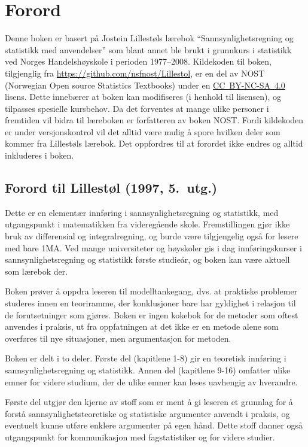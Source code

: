 
\chapter*{Forord}

Denne boken er basert på Jostein Lillestøls lærebok 
``Sannsynlighetsregning og statistikk med anvendelser'' som blant annet ble
brukt i grunnkurs i statistikk ved Norges Handelshøyskole i perioden 1977--2008.
Kildekoden til boken, tilgjenglig fra \url{https://github.com/nsfnost/Lillestol}, er en del av NOST (Norwegian Open source Statistics Textbooks)
under en \href{https://creativecommons.org/licenses/by-nc-sa/4.0/}{CC~BY-NC-SA~4.0} lisens. Dette innebærer
at boken kan modifiseres (i henhold til lisensen), og tilpasses spesielle kursbehov.
Da det forventes at mange ulike personer i fremtiden vil bidra til læreboken
er forfatteren av boken NOST. Fordi kildekoden er under versjonskontrol vil
det alltid være mulig å spore hvilken deler som kommer fra Lillestøls lærebok.
Det oppfordres til at forordet ikke endres og alltid inkluderes i boken.

\section*{Forord til Lillestøl (1997, 5.~utg.)}
Dette er en elementær innføring i sannsynlighetsregning og
statistikk, med utgangspunkt i matematikken fra videregående skole.
Fremstillingen gjør ikke bruk av differensial og integralregning,
og burde være tilgjengelig også for lesere med bare 1MA.
Ved mange universiteter og høyskoler gis i dag innføringskurser i
sannsynlighetsregning og statistikk første studieår, og boken kan
være aktuell som lærebok der.

Boken prøver å oppdra leseren til modelltankegang, dvs. at
praktiske problemer studeres innen en teoriramme, der konklusjoner
bare har gyldighet i relasjon til de forutsetninger som gjøres.
Boken er ingen kokebok for de metoder som oftest anvendes i praksis,
ut fra oppfatningen at det ikke er en metode alene som overføres til nye
situasjoner, men argumentasjon for metoden.

Boken er delt i to deler.  Første del (kapitlene 1-8) gir en teoretisk
innføring i sannsynlighetsregning og statistikk.  Annen del (kapitlene
9-16) omfatter ulike emner for videre studium, der de ulike emner kan leses
uavhengig av hverandre.

Første del utgjør den kjerne av stoff som er ment å gi leseren
et grunnlag for å forstå sannsynlighetsteoretiske og statistiske
argumenter anvendt i praksis, og eventuelt kunne utføre enklere 
argumenter på egen hånd.  Dette stoff danner også utgangspunkt 
for kommunikasjon med fagstatistiker og for videre studier.

